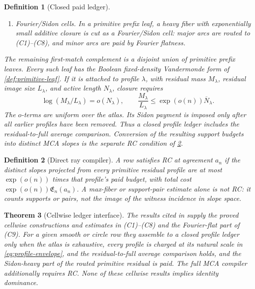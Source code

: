 \documentclass[11pt,a4paper]{amsart}
\numberwithin{equation}{section}
\newtheorem{theorem}{Theorem}[section]
\newtheorem{definition}[theorem]{Definition}
\theoremstyle{remark}
\newcommand{\barN}{\overline N}
\newcommand{\Eprof}{\mathfrak E}
\begin{document}
\begin{definition}[Closed paid ledger]
\begin{enumerate}[label=\textup{(C\arabic*)},leftmargin=2.7em]
    \item \emph{Fourier/Sidon cells.}  In a primitive prefix leaf, a heavy fiber with exponentially small additive closure is cut as a Fourier/Sidon cell: major arcs are routed to \textup{(C1)--(C8)}, and minor arcs are paid by Fourier flatness.
\end{enumerate}
The remaining first-match complement is a disjoint union of primitive
prefix leaves.  Every such leaf has the Boolean fixed-density Vandermonde
form of \cref{def:primitive-leaf}.  If it is attached to profile
\(\lambda\), with residual mass \(M_\lambda\), residual image size
\(L_\lambda\), and active length \(N_\lambda\), closure requires
\[
 \log(M_\lambda/L_\lambda)=o(N_\lambda),\qquad
 \frac{M_\lambda}{L_\lambda}
 \le\exp(o(n))\barN_\lambda.
\]
The \(o\)-terms are uniform over the atlas.  Its Sidon payment is imposed
only after all earlier profiles have been
removed.  Thus a closed profile ledger includes the residual-to-full
average comparison.  Conversion of the resulting support budgets into
distinct MCA slopes is the separate RC condition of
\cref{def:ray-compiler}.
\end{definition}

\begin{definition}[Direct ray compiler]\label{def:ray-compiler}
A row satisfies \emph{RC} at agreement \(a_n\) if the distinct slopes
projected from every primitive residual profile are at most
\(\exp(o(n))\) times that profile's paid budget, with total cost
\(\exp(o(n))\Eprof_n(a_n)\).  A max-fiber or support-pair estimate alone
is not RC: it counts supports or pairs, not the image of the witness
incidence in slope space.
\end{definition}

\begin{theorem}[Cellwise ledger interface]\label{thm:closed-ledger-package}
The results cited in \cite{Cho26CapV13,Cho26Grande} supply the proved
cellwise constructions and estimates in \textup{(C1)--(C8)} and the
Fourier-flat part of \textup{(C9)}.  For a given smooth or circle row they assemble to
a closed profile ledger only when the atlas is exhaustive, every profile is
charged at its natural scale in \eqref{eq:profile-envelope}, and the
residual-to-full average comparison holds, and the Sidon-heavy part of the
routed primitive residual is paid.  The full MCA compiler additionally
requires RC.  None of these cellwise results implies identity dominance.
\end{theorem}
\end{document}

